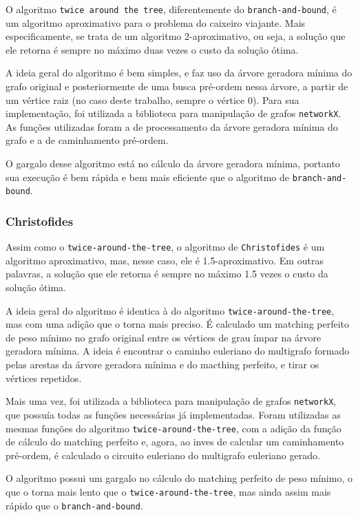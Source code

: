 \documentclass{article}
\begin{document}
O algoritmo \texttt{twice around the tree}, diferentemente do \texttt{branch-and-bound}, é um algoritmo aproximativo para o problema do caixeiro viajante. Mais especificamente, se trata de um algoritmo 2-aproximativo, ou seja, a solução que ele retorna é sempre no máximo duas vezes o custo da solução ótima.

A ideia geral do algoritmo é bem simples, e faz uso da árvore geradora mínima do grafo original e posteriormente de uma busca pré-ordem nessa árvore, a partir de um vértice raiz (no caso deste trabalho, sempre o vértice 0). Para sua implementação, foi utilizada a biblioteca para manipulação de grafos \texttt{networkX}. As funções utilizadas foram a de processamento da árvore geradora mínima do grafo e a de caminhamento pré-ordem.

O gargalo desse algoritmo está no cálculo da árvore geradora mínima, portanto sua execução é bem rápida e bem mais eficiente que o algoritmo de \texttt{branch-and-bound}.

\subsubsection{Christofides}

Assim como o \texttt{twice-around-the-tree}, o algoritmo de \texttt{Christofides} é um algoritmo aproximativo, mas, nesse caso, ele é 1.5-aproximativo. Em outras palavras, a solução que ele retorna é sempre no máximo 1.5 vezes o custo da solução ótima.

A ideia geral do algoritmo é identica à do algoritmo \texttt{twice-around-the-tree}, mas com uma adição que o torna mais preciso. É calculado um matching perfeito de peso mínimo no grafo original entre os vértices de grau ímpar na árvore geradora mínima. A ideia é encontrar o caminho euleriano do multigrafo formado pelas arestas da árvore geradora mínima e do macthing perfeito, e tirar os vértices repetidos.

Mais uma vez, foi utilizada a biblioteca para manipulação de grafos \texttt{networkX}, que possuía todas as funções necessárias já implementadas. Foram utilizadas as mesmas funções do algoritmo \texttt{twice-around-the-tree}, com a adição da função de cálculo do matching perfeito e, agora, ao inves de calcular um caminhamento pré-ordem, é calculado o circuito euleriano do multigrafo euleriano gerado.

O algoritmo possui um gargalo no cálculo do matching perfeito de peso mínimo, o que o torna mais lento que o \texttt{twice-around-the-tree}, mas ainda assim mais rápido que o \texttt{branch-and-bound}.
\end{document}

